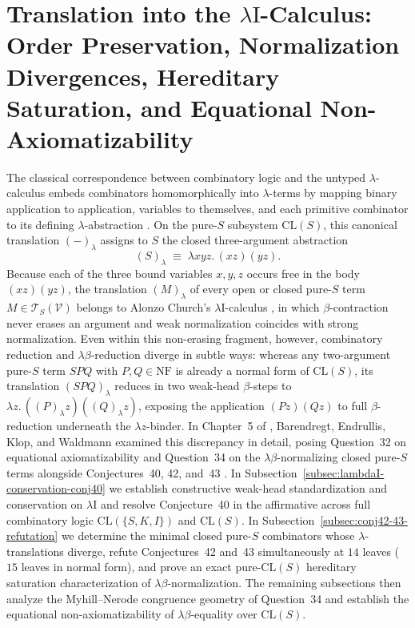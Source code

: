 \documentclass[11pt,reqno]{amsart}
\numberwithin{equation}{section}
\theoremstyle{plain}
\theoremstyle{definition}
\theoremstyle{remark}
\newcommand{\CLS}{\mathrm{CL}(S)}
\newcommand{\TSV}{\mathcal{T}_S(\mathcal{V})}
\newcommand{\NF}{\mathrm{NF}}
\begin{document}
\section{Translation into the \texorpdfstring{$\lambda\mathrm{I}$}{lambda-I}-Calculus: Order Preservation, Normalization Divergences, Hereditary Saturation, and Equational Non-Axiomatizability}\label{sec:lambda-translation}

The classical correspondence between combinatory logic and the untyped $\lambda$-calculus embeds combinators homomorphically into $\lambda$-terms by mapping binary application to application, variables to themselves, and each primitive combinator to its defining $\lambda$-abstraction \cite{CurryFeys1958,Barendregt1984,HindleySeldin2008}. On the pure-$S$ subsystem $\CLS$, this canonical translation $(-)_\lambda$ assigns to $S$ the closed three-argument abstraction
\begin{equation}\label{eq:lambda-s-def}
  (S)_\lambda \;\equiv\; \lambda x y z.\, (x z)(y z).
\end{equation}
Because each of the three bound variables $x, y, z$ occurs free in the body $(x z)(y z)$, the translation $(M)_\lambda$ of every open or closed pure-$S$ term $M \in \TSV$ belongs to Alonzo Church's $\lambda\mathrm{I}$-calculus \cite{Church1941}, in which $\beta$-contraction never erases an argument and weak normalization coincides with strong normalization. Even within this non-erasing fragment, however, combinatory reduction and $\lambda\beta$-reduction diverge in subtle ways: whereas any two-argument pure-$S$ term $S P Q$ with $P, Q \in \NF$ is already a normal form of $\CLS$, its translation $(S P Q)_\lambda$ reduces in two weak-head $\beta$-steps to $\lambda z.\, ((P)_\lambda z)((Q)_\lambda z)$, exposing the application $(P z)(Q z)$ to full $\beta$-reduction underneath the $\lambda z$-binder. In Chapter~5 of \cite{BarendregtEndrullisKlopWaldmann2017}, Barendregt, Endrullis, Klop, and Waldmann examined this discrepancy in detail, posing Question~32 on equational axiomatizability and Question~34 on the $\lambda\beta$-normalizing closed pure-$S$ terms alongside Conjectures~40, 42, and~43 \cite[pp.~94--96, 98--102]{BarendregtEndrullisKlopWaldmann2017}. In Subsection~\ref{subsec:lambdaI-conservation-conj40} we establish constructive weak-head standardization and conservation on $\lambda\mathrm{I}$ and resolve Conjecture~40 in the affirmative across full combinatory logic $\mathrm{CL}(\{S, K, I\})$ and $\CLS$. In Subsection~\ref{subsec:conj42-43-refutation} we determine the minimal closed pure-$S$ combinators whose $\lambda$-translations diverge, refute Conjectures~42 and~43 simultaneously at $14$ leaves ($15$ leaves in normal form), and prove an exact pure-$\CLS$ hereditary saturation characterization of $\lambda\beta$-normalization. The remaining subsections then analyze the Myhill--Nerode congruence geometry of Question~34 and establish the equational non-axiomatizability of $\lambda\beta$-equality over $\CLS$.
\end{document}
